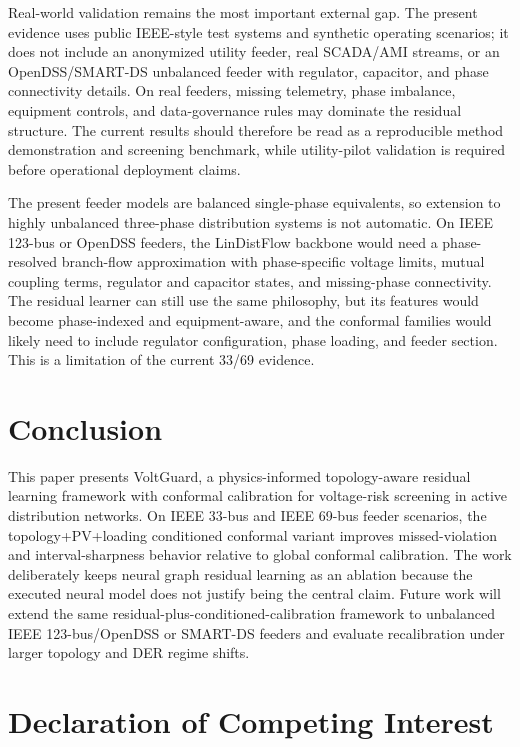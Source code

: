 \documentclass[
  preprint,12pt]{elsarticle}
\begin{document}
Real-world validation remains the most important external gap. The
present evidence uses public IEEE-style test systems and synthetic
operating scenarios; it does not include an anonymized utility feeder,
real SCADA/AMI streams, or an OpenDSS/SMART-DS unbalanced feeder with
regulator, capacitor, and phase connectivity details. On real feeders,
missing telemetry, phase imbalance, equipment controls, and
data-governance rules may dominate the residual structure. The current
results should therefore be read as a reproducible method demonstration
and screening benchmark, while utility-pilot validation is required
before operational deployment claims.

The present feeder models are balanced single-phase equivalents, so
extension to highly unbalanced three-phase distribution systems is not
automatic. On IEEE 123-bus or OpenDSS feeders, the LinDistFlow backbone
would need a phase-resolved branch-flow approximation with
phase-specific voltage limits, mutual coupling terms, regulator and
capacitor states, and missing-phase connectivity. The residual learner
can still use the same philosophy, but its features would become
phase-indexed and equipment-aware, and the conformal families would
likely need to include regulator configuration, phase loading, and
feeder section. This is a limitation of the current 33/69 evidence.

\section{Conclusion}\label{conclusion}

This paper presents VoltGuard, a physics-informed topology-aware
residual learning framework with conformal calibration for voltage-risk
screening in active distribution networks. On IEEE 33-bus and IEEE
69-bus feeder scenarios, the topology+PV+loading conditioned conformal
variant improves missed-violation and interval-sharpness behavior
relative to global conformal calibration. The work deliberately keeps
neural graph residual learning as an ablation because the executed
neural model does not justify being the central claim. Future work will
extend the same residual-plus-conditioned-calibration framework to
unbalanced IEEE 123-bus/OpenDSS or SMART-DS feeders and evaluate
recalibration under larger topology and DER regime shifts.

\section*{Declaration of Competing
Interest}\label{declaration-of-competing-interest}
\end{document}

